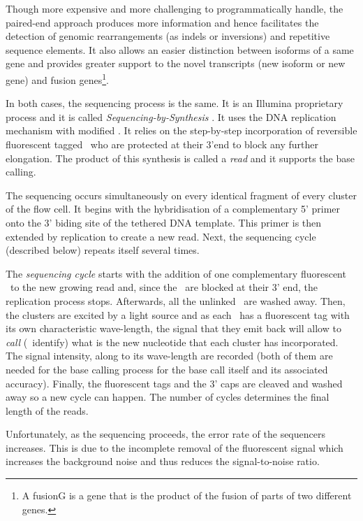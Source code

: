 Though more expensive and more challenging to programmatically handle,
the paired-end approach produces more information and hence facilitates
the detection of genomic rearrangements (as indels or inversions) and
repetitive sequence elements.
It also allows an easier distinction between isoforms of a same gene and provides
greater support to the novel transcripts (new isoform or new gene) and fusion
genes\footnote{A \gls{fusionG} is a gene that is the product of the fusion of
parts of two different genes.}.

In both cases, the sequencing process is the same. It is an Illumina proprietary
process and it is called \emph{Sequencing-by-Synthesis} .
It uses the \gls{DNA} replication mechanism with modified \dNTPs.
It relies on the step-by-step incorporation of
reversible fluorescent tagged \dNTPs\ who are protected at
their 3'end to block any further elongation.
The product of this synthesis is called a \emph{read} and it supports the base
calling.

The sequencing occurs simultaneously on every identical fragment
of every cluster of the flow cell.
It begins with the hybridisation of a complementary 5' primer onto the 3' biding
site of the tethered \gls{DNA} template. This primer is then extended by
replication to create a new read. Next, the sequencing cycle (described below)
repeats itself several times.

The \emph{sequencing cycle} starts with the addition of one complementary
fluorescent \dNTP\ to the new growing read and, since the \dNTPs\ are blocked at
their 3' end, the replication process stops. Afterwards, all the unlinked
\dNTPs\ are washed away. Then, the clusters are excited by a light source
and as each
\dNTPs\ has a fluorescent tag with its own characteristic wave-length, the
signal that they emit back will allow to \emph{call} (\ie\ identify) what is the
new nucleotide that each cluster has incorporated. The signal intensity, along to
its wave-length are recorded (both of them are needed for the base calling
process for the base call itself and its associated accuracy). Finally,
the fluorescent tags and the 3' caps are cleaved
and washed away so a new cycle can happen.
The number of cycles determines the final length of the reads.

Unfortunately, as the sequencing proceeds, the error rate of the sequencers
increases. This is due to the incomplete removal of the fluorescent signal which
increases the background noise and thus reduces the signal-to-noise ratio.

